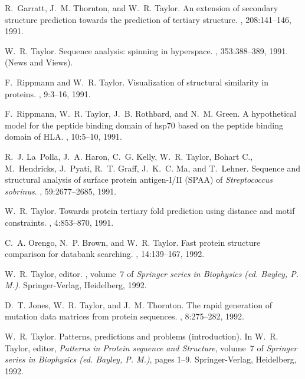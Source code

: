 \begin{thebibliography}{100}
R.~Garratt, J.~M. Thornton, and W.~R. Taylor.
\newblock An extension of secondary structure prediction towards the prediction
  of tertiary structure.
, 208:141--146, 1991.

W.~R. Taylor.
\newblock Sequence analysis: spinning in hyperspace.
, 353:388--389, 1991.
\newblock (News and Views).

F.~Rippmann and W.~R. Taylor.
\newblock Visualization of structural similarity in proteins.
, 9:3--16, 1991.

F.~Rippmann, W.~R. Taylor, J.~B. Rothbard, and N.~M. Green.
\newblock A hypothetical model for the peptide binding domain of hsp70 based on
  the peptide binding domain of {HLA}.
, 10:5--10, 1991.

R.~J. La~Polla, J.~A. Haron, C.~G. Kelly, W.~R. Taylor, Bohart C.,
  M.~Hendricks, J.~Pyati, R.~T. Graff, J.~K.~C. Ma, and T.~Lehner.
\newblock Sequence and structural analysis of surface protein antigen-{I/II
  (SPAA)} of {{\em Streptococcus sobrinus}}.
, 59:2677--2685, 1991.

W.~R. Taylor.
\newblock Towards protein tertiary fold prediction using distance and motif
  constraints.
, 4:853--870, 1991.

C.~A. Orengo, N.~P. Brown, and W.~R. Taylor.
\newblock Fast protein structure comparison for databank searching.
, 14:139--167, 1992.

W.~R. Taylor, editor.
, volume~7 of {\em
  Springer series in Biophysics (ed. Bayley, P. M.)}.
\newblock Springer-Verlag, Heidelberg, 1992.

D.~T. Jones, W.~R. Taylor, and J.~M. Thornton.
\newblock The rapid generation of mutation data matrices from protein
  sequences.
, 8:275--282, 1992.

W.~R. Taylor.
\newblock Patterns, predictions and problems (introduction).
\newblock In W.~R. Taylor, editor, {\em Patterns in Protein sequence and
  Structure}, volume~7 of {\em Springer series in Biophysics (ed. Bayley, P.
  M.)}, pages 1--9. Springer-Verlag, Heidelberg, 1992.


\end{thebibliography}
